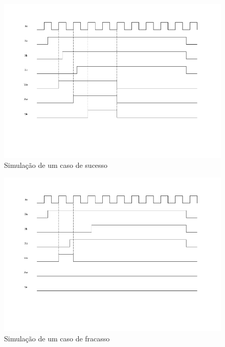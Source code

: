 \documentclass[12pt,a4paper]{article}
\begin{document}
\begin{figure}[h]
\begin{center}
\includegraphics[width=\textwidth]{simu1.png}
\end{center}
\caption{Simulação de um caso de sucesso}
\end{figure}


\begin{figure}[h]
\begin{center}
\includegraphics[width=\textwidth]{simu2.png}
\end{center}
\caption{Simulação de um caso de fracasso}
\end{figure}
\end{document}
